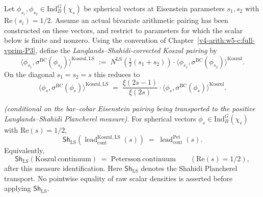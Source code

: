 \begin{definition}
\label{v4-arith:w6-c:def:LS-Koszul}
Let \(\phi_{s_{1}},\phi_{s_{2}}\in\mathrm{Ind}_{B}^{G}(\chi_{s})\)
be spherical vectors at Eisenstein parameters \(s_{1},s_{2}\) with
\(\mathrm{Re}(s_{i})=1/2\). Assume an actual bivariate arithmetic
pairing has been constructed on these vectors, and restrict to parameters
for which the scalar below is finite and nonzero. Using the convention
of Chapter~\ref{v4-arith:w5-c:full-vprim-P3}, define the
\emph{Langlands--Shahidi-corrected Koszul pairing} by
\begin{equation}
\label{v4-arith:w6-c:eq:LS-Koszul-def}
\bigl\langle\phi_{s_{1}},\sigma^{\mathrm{BC}}(\phi_{s_{2}})\bigr\rangle^{\mathrm{Koszul},\mathrm{LS}}
\;:=\;N^{\mathrm{LS}}(\tfrac{1}{2}(s_{1}+s_{2}))\cdot\bigl\langle\phi_{s_{1}},\sigma^{\mathrm{BC}}(\phi_{s_{2}})\bigr\rangle^{\mathrm{Koszul}}.
\end{equation}
On the diagonal \(s_{1}=s_{2}=s\) this reduces to
\begin{equation}
\label{v4-arith:w6-c:eq:LS-Koszul-diagonal}
\bigl\langle\phi_{s},\sigma^{\mathrm{BC}}(\phi_{s})\bigr\rangle^{\mathrm{Koszul},\mathrm{LS}}
\;=\;\frac{\xi(2s-1)}{\xi(2s)}\cdot\bigl\langle\phi_{s},\sigma^{\mathrm{BC}}(\phi_{s})\bigr\rangle^{\mathrm{Koszul}}.
\end{equation}
\end{definition}

\begin{theorem}
\label{v4-arith:w6-c:thm:density-match}
\ClaimStatusProvedHereConditional \emph{(conditional on the
bar--cobar Eisenstein pairing being transported to the positive
Langlands--Shahidi Plancherel measure)}. For spherical vectors
\(\phi_{s}\in\mathrm{Ind}_{B}^{G}(\chi_{s})\) with \(\mathrm{Re}(s)=1/2\),
\begin{equation}
\label{v4-arith:w6-c:eq:density-match}
\mathsf{Sh}_{\mathrm{LS}}\!\left(\operatorname{lead}^{\mathrm{Koszul},\mathrm{LS}}_{\mathrm{cont}}(s)\right)
\;=\;\operatorname{lead}^{\mathrm{Pet}}_{\mathrm{cont}}(s).
\end{equation}
Equivalently,
\begin{equation}
\label{v4-arith:w6-c:eq:density-match-equiv}
\mathsf{Sh}_{\mathrm{LS}}\!\left(\mathrm{Koszul\ continuum}\right)
\;=\;\mathrm{Petersson\ continuum}\qquad(\mathrm{Re}(s)=1/2),
\end{equation}
after this measure identification. Here \(\mathsf{Sh}_{\mathrm{LS}}\)
denotes the Shahidi Plancherel transport. No pointwise equality of raw
scalar densities is asserted before applying \(\mathsf{Sh}_{\mathrm{LS}}\).
\end{theorem}

